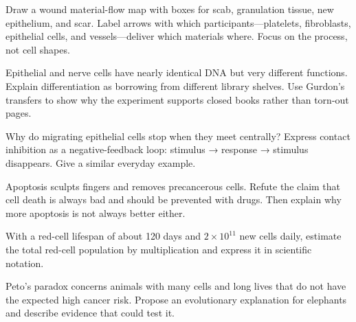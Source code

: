 \begin{sikaoti}
\item Draw a wound material-flow map with boxes for scab, granulation tissue, new epithelium, and scar. Label arrows with which participants---platelets, fibroblasts, epithelial cells, and vessels---deliver which materials where. Focus on the process, not cell shapes.
\item Epithelial and nerve cells have nearly identical DNA but very different functions. Explain differentiation as borrowing from different library shelves. Use Gurdon's transfers to show why the experiment supports closed books rather than torn-out pages.
\item Why do migrating epithelial cells stop when they meet centrally? Express contact inhibition as a negative-feedback loop: stimulus → response → stimulus disappears. Give a similar everyday example.
\item Apoptosis sculpts fingers and removes precancerous cells. Refute the claim that cell death is always bad and should be prevented with drugs. Then explain why more apoptosis is not always better either.
\item With a red-cell lifespan of about 120 days and $2\times 10^{11}$ new cells daily, estimate the total red-cell population by multiplication and express it in scientific notation.
\item Peto's paradox concerns animals with many cells and long lives that do not have the expected high cancer risk. Propose an evolutionary explanation for elephants and describe evidence that could test it.
\end{sikaoti}
